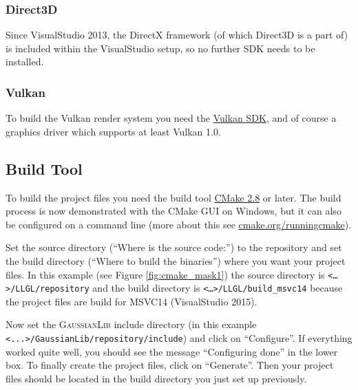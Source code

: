 \documentclass{article}
\begin{document}
\subsubsection{Direct3D}

Since VisualStudio 2013, the DirectX framework (of which Direct3D is a part of) is included within
the VisualStudio setup, so no further SDK needs to be installed.

\subsubsection{Vulkan}

To build the Vulkan render system you need the \href{https://lunarg.com/vulkan-sdk/}{Vulkan SDK},
and of course a graphics driver which supports at least Vulkan 1.0.

\subsection{Build Tool}

To build the \LLGL project files you need the build tool \href{https://cmake.org/}{CMake 2.8} or later.
The build process is now demonstrated with the CMake GUI on Windows, but it can also be configured
on a command line (more about this see \href{https://cmake.org/runningcmake/}{cmake.org/runningcmake}).

Set the source directory (``Where is the source code:'') to the \LLGL repository
and set the build directory (``Where to build the binaries'') where you want your project files.
In this example (see Figure \ref{fig:cmake_mask1}) the source directory is \texttt{<\dots>/LLGL/repository}
and the build directory is \texttt{<\dots>/LLGL/build\_msvc14} because the project files are build
for MSVC14 (VisualStudio 2015).

Now set the \textsc{GaussianLib} include directory (in this example \texttt{<...>/GaussianLib/repository/include})
and click on ``Configure''. If everything worked quite well, you should see the message ``Configuring done''
in the lower box. To finally create the project files, click on ``Generate''.
Then your project files should be located in the build directory you just set up previously.
\end{document}
